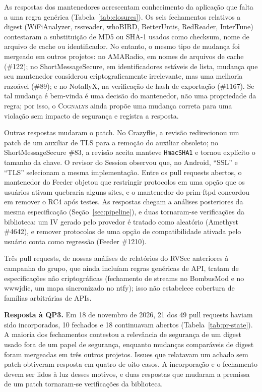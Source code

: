 \documentclass[conference]{IEEEtran}
\newcommand{\system}{\textsc{Cognalys}}
\newcommand{\researchq}[1]{\textbf{QP#1}}
\begin{document}
As respostas dos mantenedores acrescentam conhecimento da aplicação que falta a uma regra genérica
(Tabela~\ref{tab:closures}). Os seis fechamentos relativos a digest (WiFiAnalyzer, rssreader,
whoBIRD, BetterUntis, RedReader, InterTune) contestaram a substituição de MD5 ou SHA-1
usados como checksum, nome de arquivo de cache ou identificador. No entanto, o mesmo tipo de
mudança foi mergeado em outros projetos: no AMARadio, em nomes de arquivos de cache (\#122);
no ShortMessageSecure, em identificadores estáveis de lista, mudança que seu mantenedor considerou
criptograficamente irrelevante, mas uma melhoria razoável (\#89); e no NotallyX,
na verificação de hash de exportação (\#1167). Se tal mudança é bem-vinda é uma
decisão do mantenedor, não uma propriedade da regra; por isso, o {\system} ainda propõe
uma mudança correta para uma violação sem impacto de segurança e registra a
resposta.

Outras respostas mudaram o patch. No Crazyflie, a revisão redirecionou um patch de um
auxiliar de TLS para a remoção do auxiliar obsoleto; no ShortMessageSecure \#83,
a revisão aceita manteve \texttt{HmacSHA1} e tornou explícito o tamanho da chave.
O revisor do Session observou que, no Android, ``SSL'' e ``TLS'' selecionam a mesma
implementação. Entre os pull requests abertos, o mantenedor do Feeder objetou
que restringir protocolos em uma opção que os usuários ativam quebraria alguns sites,
e o mantenedor do prim-ftpd concordou em remover o RC4 após testes. As respostas
chegam a análises posteriores da mesma especificação (Seção~\ref{sec:pipeline}),
e duas tornaram-se verificações da biblioteca: um IV gerado pelo provedor é tratado como aleatório
(Amethyst \#4642), e remover protocolos de uma opção de compatibilidade ativada pelo usuário
conta como regressão (Feeder \#1210).

Três pull requests, de nossas análises de relatórios do RVSec anteriores à
campanha do grupo, que ainda incluíam regras genéricas de API, tratam de especificações não criptográficas (fechamento de streams no BombusMod
e no wwwjdic, um mapa sincronizado no ntfy); isso não estabelece cobertura de
famílias arbitrárias de APIs.

\textbf{Resposta à \researchq{3}.} Em 18 de novembro de 2026, 21 dos 49 pull
requests haviam sido incorporados, 10 fechados e 18 continuavam abertos
(Tabela~\ref{tab:pr-state}). A maioria dos fechamentos contestou a relevância de segurança de um
digest usado fora de um papel de segurança, enquanto mudanças comparáveis de digest foram
mergeadas em três outros projetos. Issues que relatavam um achado sem patch
obtiveram resposta em quatro de oito casos. A incorporação e o fechamento devem ser lidos
à luz desses motivos, e duas respostas que mudaram a premissa de um patch tornaram-se
verificações da biblioteca.
\end{document}
